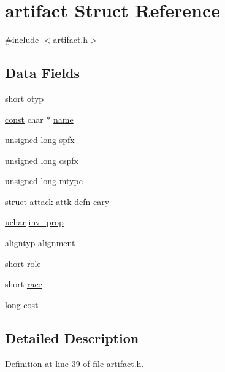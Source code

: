 \hypertarget{structartifact}{\section{artifact Struct Reference}
\label{structartifact}
}


{\ttfamily \#include $<$artifact.\+h$>$}

\subsection*{Data Fields}
\begin{DoxyCompactItemize}
\item 
short \hyperlink{structartifact_a23c01e9db7d5dacfdc29585d8b28e63f}{otyp}
\item 
\hyperlink{tradstdc_8h_a2c212835823e3c54a8ab6d95c652660e}{const} char $\ast$ \hyperlink{structartifact_aca63472a0bf308d340bc3460256f0b6d}{name}
\item 
unsigned long \hyperlink{structartifact_aa3cd121c063fb3990f5b26c66afbbc1b}{spfx}
\item 
unsigned long \hyperlink{structartifact_a2d33b1358ba1fc467f783672789a6ea1}{cspfx}
\item 
unsigned long \hyperlink{structartifact_ac45908831018212e1f1b37cca82b4d31}{mtype}
\item 
struct \hyperlink{structattack}{attack} attk defn \hyperlink{structartifact_a4dc2727628799c80e2597bd4101e0fc9}{cary}
\item 
\hyperlink{config_8h_a65f85814a8290f9797005d3b28e7e5fc}{uchar} \hyperlink{structartifact_a2e7994f81541381f55d68f9427b2d771}{inv\+\_\+prop}
\item 
\hyperlink{align_8h_a3e17b7a656899892e425fc89481aa2ab}{aligntyp} \hyperlink{structartifact_adf0fe93392024db3d65676e939087540}{alignment}
\item 
short \hyperlink{structartifact_a3cf36797d1c15e0e2852d4d412cb720b}{role}
\item 
short \hyperlink{structartifact_abb798b7eee13d59647904fd323b82fd7}{race}
\item 
long \hyperlink{structartifact_a655f854058be152ec4a6b0c5d7f40e30}{cost}
\end{DoxyCompactItemize}


\subsection{Detailed Description}


Definition at line 39 of file artifact.\+h.




